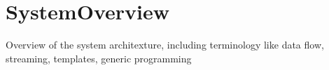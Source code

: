 \chapter{SystemOverview}

Overview of the system architexture, including terminology like 
data flow, streaming, templates, generic programming

